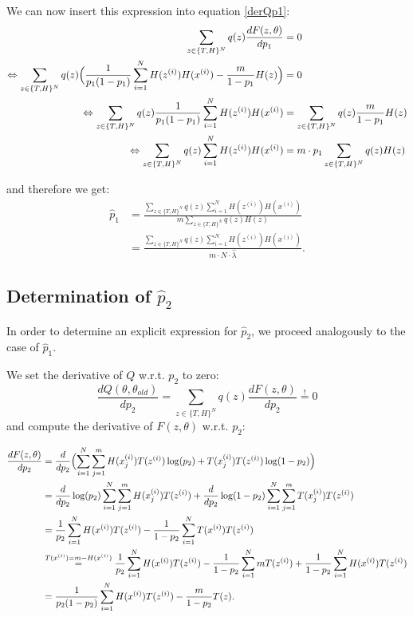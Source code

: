 \documentclass[paper=a4,fontsize=10pt,DIV11,BCOR10mm]{scrartcl}
\begin{document}
We can now insert this expression into equation \ref{derQp1}:
\begin{align*}
\sum_{z\in \{T,H\}^N} q(z) \frac{dF(z,\theta)}{d p_1} &=0\\
\Leftrightarrow \sum_{z\in \{T,H\}^N} q(z)\Bigl ( \frac{1}{p_1(1-p_1)} \sum_{i=1}^N  H(z^{(i)}) H(x^{(i)}) - \frac{m}{1-p_1} H(z) \Bigr) &=0\\
\Leftrightarrow \sum_{z\in \{T,H\}^N} q(z) \frac{1}{p_1(1-p_1)} \sum_{i=1}^N  H(z^{(i)}) H(x^{(i)}) &=\sum_{z\in \{T,H\}^N} q(z) \frac{m}{1-p_1} H(z)\\
\Leftrightarrow \sum_{z\in \{T,H\}^N} q(z) \sum_{i=1}^N  H(z^{(i)}) H(x^{(i)}) &=m \cdot p_1 \sum_{z\in \{T,H\}^N} q(z) H(z)
\end{align*}
 
 and therefore we get:
 \begin{align*}
 \hat p_1 &=\frac{ \sum_{z\in \{T,H\}^N} q(z) \sum_{i=1}^N  H(z^{(i)}) H(x^{(i)})}{m\sum_{z\in \{T,H\}^N} q(z) H(z)}\\
 &=\frac{ \sum_{z\in \{T,H\}^N} q(z) \sum_{i=1}^N  H(z^{(i)}) H(x^{(i)})}{m \cdot N  \cdot \hat \lambda}.
 \end{align*}

\subsection*{Determination of $\hat p_2$}

In order to determine an explicit expression for $\hat p_2$, we proceed analogously to the case of $\hat p_1$.

We set the derivative of $Q$ w.r.t. $p_2$ to zero:
\begin{equation}\label{derQp2}
\frac{dQ(\theta,\theta_{old})}{d p_2}=\sum_{z\in \{T,H\}^N} q(z) \frac{dF(z,\theta)}{d p_2} \stackrel{!}{=}0
\end{equation}
and compute the derivative of $F(z,\theta)$ w.r.t. $p_2$:

\begin{align*}
\frac{dF(z,\theta)}{d p_2} &= \frac{d}{d p_2} \Bigl ( \sum_{i=1}^N \sum_{j=1}^m  H(x_j^{(i)})T(z^{(i)}) \log(p_2)+ T(x_j^{(i)})T(z^{(i)}) \log (1-p_2) \Bigr )\\
&= \frac{d}{d p_2} \log(p_2)\sum_{i=1}^N \sum_{j=1}^m  H(x_j^{(i)})T(z^{(i)}) +  \frac{d}{d p_2} \log (1-p_2) \sum_{i=1}^N \sum_{j=1}^m T(x_j^{(i)})T(z^{(i)})  \\
&= \frac{1}{p_2}\sum_{i=1}^N  H(x^{(i)})T(z^{(i)}) -  \frac{1}{1- p_2}\sum_{i=1}^N  T(x^{(i)})T(z^{(i)})  \\
&\stackrel{T(x^{(i)})=m-H(x^{(i)})}{=} \frac{1}{p_2}\sum_{i=1}^N  H(x^{(i)})T(z^{(i)}) -  \frac{1}{1- p_2}\sum_{i=1}^N  m T(z^{(i)}) + \frac{1}{1- p_2}\sum_{i=1}^N H(x^{(i)})T(z^{(i)}) \\
&= \frac{1}{p_2(1-p_2)}\sum_{i=1}^N  H(x^{(i)})T(z^{(i)}) -  \frac{m}{1- p_2} T(z).
\end{align*}
\end{document}
